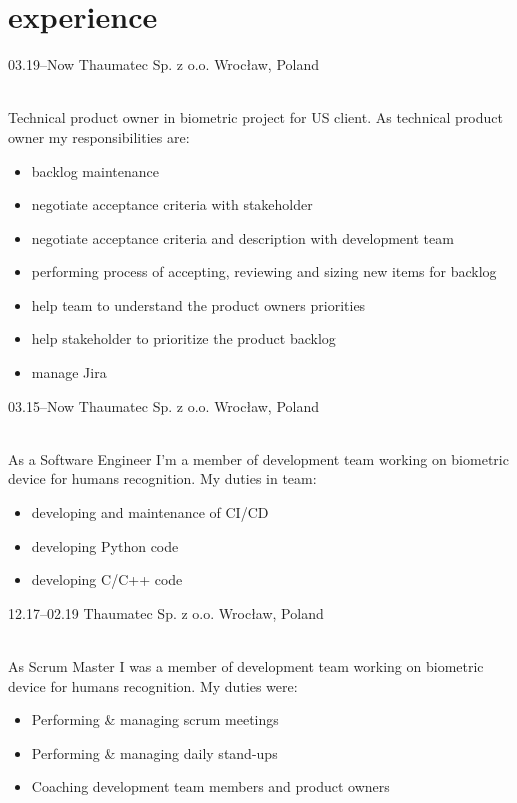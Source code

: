 \documentclass[]{cv-style}          %
\begin{document}
\section{experience}

\begin{entrylist}
\entry
  {03.19--Now}
  {Thaumatec Sp. z o.o.}
  {Wrocław, Poland}
  {\\
  Technical product owner in biometric project for US client. As technical product owner my responsibilities are:
  \begin{itemize}
    \item backlog maintenance
    \item negotiate acceptance criteria with stakeholder
    \item negotiate acceptance criteria and description with development team
    \item performing process of accepting, reviewing and sizing new items for backlog
    \item help team to understand the product owners priorities
    \item help stakeholder to prioritize the product backlog
    \item manage Jira
  \end{itemize}}
\entry
  {03.15--Now}
  {Thaumatec Sp. z o.o.}
  {Wrocław, Poland}
  {\\
  As a Software Engineer I'm a member of development team working on biometric device for humans recognition. My duties in team:
  \begin{itemize}
    \item developing and maintenance of CI/CD
    \item developing Python code
    \item developing C/C++ code
  \end{itemize}}
\entry
  {12.17--02.19}
  {Thaumatec Sp. z o.o.}
  {Wrocław, Poland}
  {\\
  As Scrum Master I was a member of development team working on biometric device for humans recognition. My duties were:
  \begin{itemize}
    \item Performing \& managing scrum meetings
    \item Performing \& managing daily stand-ups
    \item Coaching development team members and product owners

\end{itemize}}
\end{entrylist}
\end{document}
